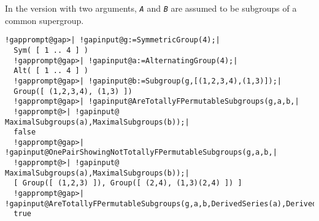 \documentclass[a4paper,11pt]{report}
\begin{document}
{{{ In the version with two arguments, \mbox{\texttt{\mdseries\slshape A}} and \mbox{\texttt{\mdseries\slshape B}} are assumed to be subgroups of a common supergroup. 

 
\begin{Verbatim}[commandchars=!@|,fontsize=\small,frame=single,label=Example]
  !gapprompt@gap>| !gapinput@g:=SymmetricGroup(4);|
  Sym( [ 1 .. 4 ] )
  !gapprompt@gap>| !gapinput@a:=AlternatingGroup(4);|
  Alt( [ 1 .. 4 ] )
  !gapprompt@gap>| !gapinput@b:=Subgroup(g,[(1,2,3,4),(1,3)]);|
  Group([ (1,2,3,4), (1,3) ])
  !gapprompt@gap>| !gapinput@AreTotallyFPermutableSubgroups(g,a,b,|
  !gapprompt@>| !gapinput@     MaximalSubgroups(a),MaximalSubgroups(b));|
  false
  !gapprompt@gap>| !gapinput@OnePairShowingNotTotallyFPermutableSubgroups(g,a,b,|
  !gapprompt@>| !gapinput@     MaximalSubgroups(a),MaximalSubgroups(b));|
  [ Group([ (1,2,3) ]), Group([ (2,4), (1,3)(2,4) ]) ]
  !gapprompt@gap>| !gapinput@AreTotallyFPermutableSubgroups(g,a,b,DerivedSeries(a),DerivedSeries(b));|
  true
\end{Verbatim}
 }

 }

 }

 
\end{document}
